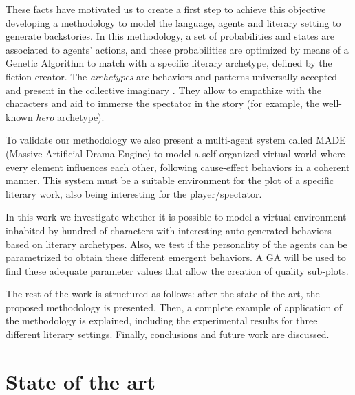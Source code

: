 \documentclass[letterpaper]{article}
\begin{document}
These facts have motivated us to create a first step to achieve this objective developing a methodology to model the language, agents and literary setting to generate backstories. In this methodology, a set of probabilities and 
states are associated to agents' actions, and these probabilities are
optimized by means of a Genetic Algorithm \citep{GAs_Goldberg89} to match with a
specific literary archetype, defined by the fiction creator. The {\em
archetypes} are behaviors and patterns universally accepted and
present in the collective imaginary
 \citep{ArchetypesGarry05}. They allow to empathize  
with the characters and aid to immerse the spectator in the story
(for example, the well-known {\em hero} archetype).






To validate our methodology we also present a multi-agent system called
MADE (Massive Artificial Drama Engine) to model a self-organized
virtual world where every element influences each other, following
cause-effect behaviors in a coherent manner. This system must be
a suitable environment for the plot of a specific literary work, also being
interesting for the player/spectator. 

In this work we investigate whether it is possible to model a virtual environment inhabited by hundred of characters with interesting auto-generated behaviors based on literary archetypes. Also, we test if the personality of the agents can be parametrized to obtain these different emergent behaviors. A GA will be used to find these adequate parameter values that allow the creation of quality sub-plots.


The rest of the work is structured as follows: after the state of the art, the proposed methodology is presented. Then, a complete example of application of the methodology is explained, including the experimental results for three different literary settings. Finally, conclusions and future work are discussed.

\section{State of the art}
\label{sec:soa}
\end{document}
